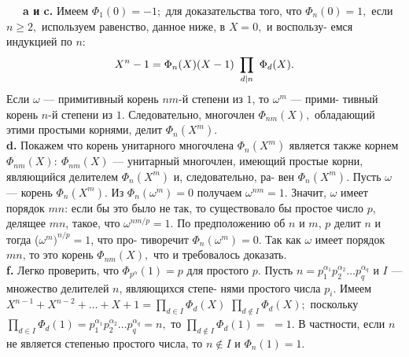\documentclass{mai_book}
\begin{document}
\indent~~~\textbf{a и c.} Имеем $\Phi_1(0)=-1;$ для доказательства того, что $\Phi_n(0)=1,$\linebreak
если $n\geq 2,$ используем равенство, данное ниже, в $X=0,$ и воспользу-\linebreak
емся индукцией по $n$:
$$
X^n-1=\Phi_n(X)(X-1)~\prod_{d|n}~\Phi_d(X). \\
$$
Если $\omega$ --- примитивный корень $nm$-й степени из $1$, то $\omega^m$ --- прими-\linebreak
тивный корень $n$-й степени из $1$. Следовательно, многочлен $\Phi_{nm}(X),$\linebreak
обладающий этими простыми корнями, делит $\Phi_n(X^m)$. \\
\indent\textbf{d.} Покажем что корень унитарного многочлена $\Phi_n(X^m)$ является\linebreak
также корнем $\Phi_{nm}(X):~\Phi_{nm}(X)$ --- унитарный многочлен, имеющий\linebreak
простые корни, являющийся делителем $\Phi_n(X^m)$ и, следовательно, ра-\linebreak
вен $\Phi_n(X^m)$. Пусть $\omega$ --- корень $\Phi_n(X^m).$ Из $\Phi_n(\omega^m)=0$ получаем\linebreak
$\omega^{nm}=1.$ Значит, $\omega$ имеет порядок $mn$: если бы это было не так, то\linebreak
существовало бы простое число $p$, делящее $mn$, такое, что $\omega^{nm/p}=1$.\linebreak
По предположению об $n$ и $m$, $p$ делит $n$ и тогда ($\omega^m)^{n/p}=1$, что про-\linebreak
тиворечит $\Phi_n(\omega^m)=0.$ Так как $\omega$ имеет порядок $mn$, то это корень\linebreak
$\Phi_{nm}(X),$ что и требовалось доказать.\\
\indent\textbf{f.} Легко проверить, что $\Phi_{p^\alpha}(1)=p$ для простого $p$. Пусть\linebreak
$n=p^{\alpha_1}_1 p^{\alpha_2}_2 \ldots p^{\alpha_q}_q$ и $I$ --- множество делителей $n$, являющихся степе-\linebreak
нями простого числа $p_i$. Имеем $X^{n-1}+X^{n-2}+\ldots+X+1=\prod\nolimits_{d\in I}\Phi_d (X) $\linebreak
$\prod\nolimits_{d\notin I}\Phi_d (X);$ поскольку $\prod\nolimits_{d\in I}\Phi_d (1)= p^{\alpha_1}_1 p^{\alpha_2}_2 \ldots p^{\alpha_q}_q=n,$ то  $\prod\nolimits_{d\notin I}\Phi_d (1)=$\linebreak
$=1$. В частности, если $n$ не является степенью простого числа, то $n\notin I$\linebreak
и $\Phi_n(1)=1.$
\setcounter{thesection}{12}
\end{document}
